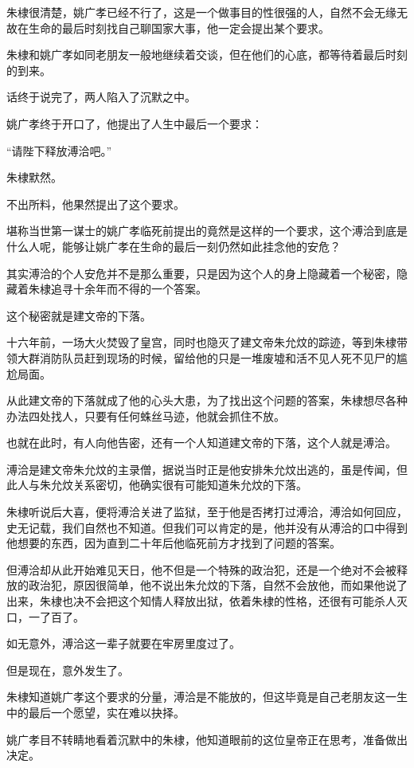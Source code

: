 \begin{multicols}{\theparacolNo}
朱棣很清楚，姚广孝已经不行了，这是一个做事目的性很强的人，自然不会无缘无故在生命的最后时刻找自己聊国家大事，他一定会提出某个要求。

朱棣和姚广孝如同老朋友一般地继续着交谈，但在他们的心底，都等待着最后时刻的到来。

话终于说完了，两人陷入了沉默之中。

姚广孝终于开口了，他提出了人生中最后一个要求：

“请陛下释放溥洽吧。”

朱棣默然。

不出所料，他果然提出了这个要求。

堪称当世第一谋士的姚广孝临死前提出的竟然是这样的一个要求，这个溥洽到底是什么人呢，能够让姚广孝在生命的最后一刻仍然如此挂念他的安危？

其实溥洽的个人安危并不是那么重要，只是因为这个人的身上隐藏着一个秘密，隐藏着朱棣追寻十余年而不得的一个答案。

这个秘密就是建文帝的下落。

十六年前，一场大火焚毁了皇宫，同时也隐灭了建文帝朱允炆的踪迹，等到朱棣带领大群消防队员赶到现场的时候，留给他的只是一堆废墟和活不见人死不见尸的尴尬局面。

从此建文帝的下落就成了他的心头大患，为了找出这个问题的答案，朱棣想尽各种办法四处找人，只要有任何蛛丝马迹，他就会抓住不放。

也就在此时，有人向他告密，还有一个人知道建文帝的下落，这个人就是溥洽。

溥洽是建文帝朱允炆的主录僧，据说当时正是他安排朱允炆出逃的，虽是传闻，但此人与朱允炆关系密切，他确实很有可能知道朱允炆的下落。

朱棣听说后大喜，便将溥洽关进了监狱，至于他是否拷打过溥洽，溥洽如何回应，史无记载，我们自然也不知道。但我们可以肯定的是，他并没有从溥洽的口中得到他想要的东西，因为直到二十年后他临死前方才找到了问题的答案。

但溥洽却从此开始难见天日，他不但是一个特殊的政治犯，还是一个绝对不会被释放的政治犯，原因很简单，他不说出朱允炆的下落，自然不会放他，而如果他说了出来，朱棣也决不会把这个知情人释放出狱，依着朱棣的性格，还很有可能杀人灭口，一了百了。

如无意外，溥洽这一辈子就要在牢房里度过了。

但是现在，意外发生了。

朱棣知道姚广孝这个要求的分量，溥洽是不能放的，但这毕竟是自己老朋友这一生中的最后一个愿望，实在难以抉择。

姚广孝目不转睛地看着沉默中的朱棣，他知道眼前的这位皇帝正在思考，准备做出决定。


\end{multicols}
